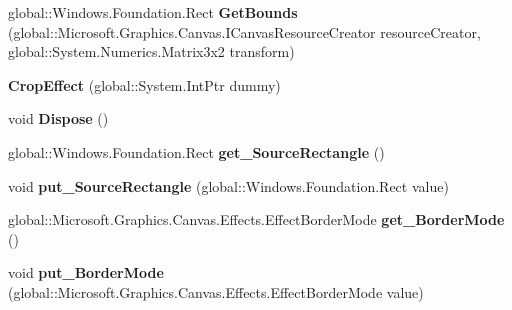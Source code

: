 \begin{DoxyCompactItemize}
\item 
\mbox{\label{class_microsoft_1_1_graphics_1_1_canvas_1_1_effects_1_1_crop_effect_a16b720a896e82a3c3dd7f6de5b04f6f0}} 
global\+::\+Windows.\+Foundation.\+Rect {\bfseries Get\+Bounds} (global\+::\+Microsoft.\+Graphics.\+Canvas.\+I\+Canvas\+Resource\+Creator resource\+Creator, global\+::\+System.\+Numerics.\+Matrix3x2 transform)
\item 
\mbox{\label{class_microsoft_1_1_graphics_1_1_canvas_1_1_effects_1_1_crop_effect_a0c77e082f46f52291276ece0f7fae253}} 
{\bfseries Crop\+Effect} (global\+::\+System.\+Int\+Ptr dummy)
\item 
\mbox{\label{class_microsoft_1_1_graphics_1_1_canvas_1_1_effects_1_1_crop_effect_a9b3ea35f19a680f460f21d9a9e788048}} 
void {\bfseries Dispose} ()
\item 
\mbox{\label{class_microsoft_1_1_graphics_1_1_canvas_1_1_effects_1_1_crop_effect_a7623c2c77a5d02cdfdd9c57daadea17b}} 
global\+::\+Windows.\+Foundation.\+Rect {\bfseries get\+\_\+\+Source\+Rectangle} ()
\item 
\mbox{\label{class_microsoft_1_1_graphics_1_1_canvas_1_1_effects_1_1_crop_effect_a1d926a1f046dba84ddf63f41d43adb8d}} 
void {\bfseries put\+\_\+\+Source\+Rectangle} (global\+::\+Windows.\+Foundation.\+Rect value)
\item 
\mbox{\label{class_microsoft_1_1_graphics_1_1_canvas_1_1_effects_1_1_crop_effect_ad455f8e79c452f9b75bdc6cce955b14c}} 
global\+::\+Microsoft.\+Graphics.\+Canvas.\+Effects.\+Effect\+Border\+Mode {\bfseries get\+\_\+\+Border\+Mode} ()
\item 
\mbox{\label{class_microsoft_1_1_graphics_1_1_canvas_1_1_effects_1_1_crop_effect_a44f8835555e034c842513c801cfdf55f}} 
void {\bfseries put\+\_\+\+Border\+Mode} (global\+::\+Microsoft.\+Graphics.\+Canvas.\+Effects.\+Effect\+Border\+Mode value)

\end{DoxyCompactItemize}
